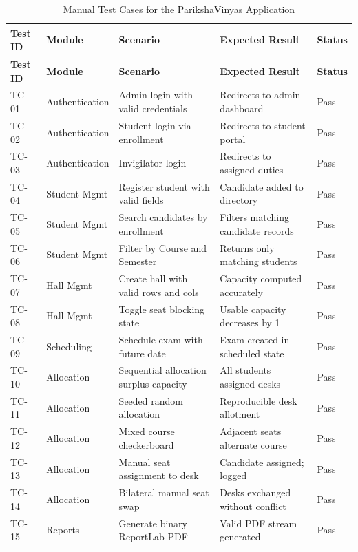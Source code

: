 \documentclass{InternshipReport}
\begin{document}
\begin{longtable}{p{} p{} p{} p{} p{}}
\caption{Manual Test Cases for the ParikshaVinyas Application} \label{tab:manual_test_cases} \\
\toprule
\textbf{Test ID} & \textbf{Module} & \textbf{Scenario} & \textbf{Expected Result} & \textbf{Status} \\
\midrule
\endfirsthead
\toprule
\textbf{Test ID} & \textbf{Module} & \textbf{Scenario} & \textbf{Expected Result} & \textbf{Status} \\
\midrule
\endhead
\bottomrule
\endfoot
TC-01 & Authentication & Admin login with valid credentials & Redirects to admin dashboard & Pass \\
TC-02 & Authentication & Student login via enrollment & Redirects to student portal & Pass \\
TC-03 & Authentication & Invigilator login & Redirects to assigned duties & Pass \\
TC-04 & Student Mgmt & Register student with valid fields & Candidate added to directory & Pass \\
TC-05 & Student Mgmt & Search candidates by enrollment & Filters matching candidate records & Pass \\
TC-06 & Student Mgmt & Filter by Course and Semester & Returns only matching students & Pass \\
TC-07 & Hall Mgmt & Create hall with valid rows and cols & Capacity computed accurately & Pass \\
TC-08 & Hall Mgmt & Toggle seat blocking state & Usable capacity decreases by 1 & Pass \\
TC-09 & Scheduling & Schedule exam with future date & Exam created in scheduled state & Pass \\
TC-10 & Allocation & Sequential allocation surplus capacity & All students assigned desks & Pass \\
TC-11 & Allocation & Seeded random allocation & Reproducible desk allotment & Pass \\
TC-12 & Allocation & Mixed course checkerboard & Adjacent seats alternate course & Pass \\
TC-13 & Allocation & Manual seat assignment to desk & Candidate assigned; logged & Pass \\
TC-14 & Allocation & Bilateral manual seat swap & Desks exchanged without conflict & Pass \\
TC-15 & Reports & Generate binary ReportLab PDF & Valid PDF stream generated & Pass \\

\end{longtable}
\end{document}
